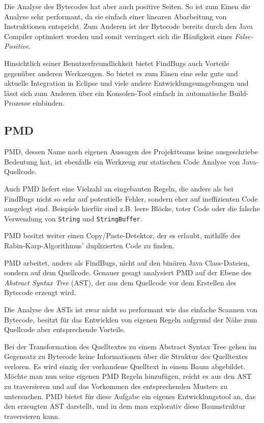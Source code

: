 Die Analyse des Bytecodes hat aber auch positive Seiten. So ist zum Einen die Analyse sehr performant, da sie einfach einer linearen Abarbeitung von Instruktionen entspricht. Zum Anderen ist der Bytecode bereits durch den Java Compiler optimiert worden und somit verringert sich die Häufigkeit eines \textit{False-Positive}.

Hinsichtlich seiner Benutzerfreundlichkeit bietet FindBugs auch Vorteile gegenüber anderen Werkzeugen. So bietet es zum Einen eine sehr gute und aktuelle Integration in Eclipse und viele andere Entwicklungsumgebungen und lässt sich zum Anderen über ein Konsolen-Tool einfach in automatische Build-Prozesse einbinden.


\subsection{PMD}
PMD, dessen Name nach eigenen Aussagen des Projektteams keine ausgeschriebe Bedeutung hat, ist ebenfalls ein Werkzeug zur statischen Code Analyse von Java-Quellcode. 

Auch PMD liefert eine Vielzahl an eingebauten Regeln, die anders als bei FindBugs nicht so sehr auf potentielle Fehler, sondern eher auf ineffizienten Code ausgelegt sind. Beispiele hierfür sind z.B. leere Blöcke, toter Code oder die falsche Verwendung von \verb=String= und \verb=StringBuffer=. 

PMD besitzt weiter einen Copy/Paste-Detektor, der es erlaubt, mithilfe des Rabin-Karp-Algorithmus' duplizierten Code zu finden.

PMD arbeitet, anders als FindBugs, nicht auf den binären Java Class-Dateien, sondern auf dem Quellcode. Genauer gesagt analysiert PMD auf der Ebene des \textit{Abstract Syntax Tree} (AST), der aus dem Quellcode vor dem Erstellen des Bytecode erzeugt wird. 

Die Analyse des ASTs ist zwar nicht so performant wie das einfache Scannen von Bytecode, besitzt für das Entwicklen von eigenen Regeln aufgrund der Nähe zum Quellcode aber entsprechende Vorteile.

Bei der Transformation des Quelltextes zu einem Abstract Syntax Tree gehen im Gegensatz zu Bytecode keine Informationen über die Struktur des Quelltextes verloren. Es wird einzig der vorhandene Quelltext in einem Baum abgebildet. 
Möchte man nun seine eigenen PMD Regeln hinzufügen, reicht es aus den AST zu traversieren und auf das Vorkommen des entsprechenden Musters zu untersuchen. PMD bietet für diese Aufgabe ein eigenes Entwicklungstool an, das den erzeugten AST darstellt, und in dem man explorativ diese Baumstruktur traversieren kann.

